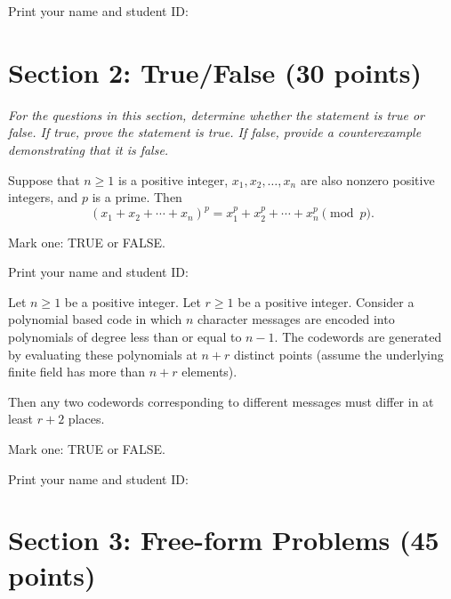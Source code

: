 \documentclass[11pt,fleqn]{article}
\newcommand{\fillin}[1]{\underline{\hskip #1}}
\newcommand{\startnewpage}{\newpage \noindent \vspace{0mm} {\sc Print} your name and student ID: \fillin{5in}\\[-0.2in]}
\begin{document}
\begin{qunlist}


\startnewpage

\section*{Section 2: True/False (30 points)}

\textit{For the questions in this section, determine whether the
  statement is true or false. If true, prove the statement is true. If 
  false, provide a counterexample demonstrating that it is false.}




Suppose that $n \geq 1$ is a positive integer, $x_1,x_2,\ldots,x_n$
are also nonzero positive integers, and $p$ is a prime. Then
\begin{displaymath}
	(x_1+x_2+ \cdots +x_n)^p=x_1^p+x_2^p+ \cdots +x_n^p \pmod{p}.
\end{displaymath}

Mark one: {\sc TRUE} or {\sc FALSE}.

\startnewpage


Let $n \geq 1$ be a positive integer. Let $r \geq 1$ be
a positive integer. Consider a polynomial based code in which
$n$ character messages are encoded into polynomials of degree less
than or equal to $n-1$. The codewords are generated by evaluating
these polynomials at $n+r$ distinct points (assume the underlying
finite field has more than $n+r$ elements). 

Then any two codewords corresponding to different messages must
differ in at least $r+2$ places. 

Mark one: {\sc TRUE} or {\sc FALSE}.

\vspace{3in}




\startnewpage




\section*{Section 3: Free-form Problems (45 points)}


\end{qunlist}
\end{document}
